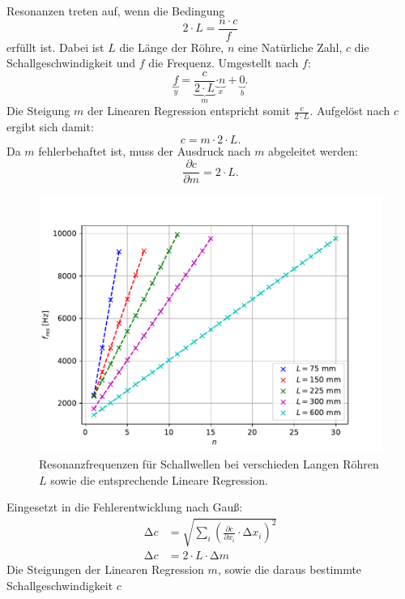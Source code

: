 Resonanzen treten auf, wenn die Bedingung
\begin{equation}
  2\cdot L=\frac{n\cdot c}{f}
\end{equation}
erfüllt ist. Dabei ist $L$ die Länge der Röhre, $n$ eine Natürliche Zahl, $c$ die Schallgeschwindigkeit und $f$ die Frequenz.
Umgestellt nach $f$:
\begin{equation}
  \underbrace{f}_{y}=\underbrace{\frac{c}{2\cdot L}}_{m}\underbrace{\cdot n}_{x}+\underbrace{0}_{b}.
\end{equation}
Die Steigung $m$ der Linearen Regression entspricht somit $\frac{c}{2\cdot L}$. Aufgelöst nach $c$ ergibt sich damit:
\begin{equation}
  c=m\cdot2\cdot L.
\end{equation}
Da $m$ fehlerbehaftet ist, muss der Ausdruck nach $m$ abgeleitet werden:
\begin{equation}
  \frac{\partial c}{\partial m}=2\cdot L.
\end{equation}
\begin{figure}
  \centering
  \includegraphics[scale=0.45]{Messwerte/plot3.pdf}
  \caption{Resonanzfrequenzen für Schallwellen bei verschieden Langen Röhren $L$ sowie die entsprechende Lineare Regression.}
  \label{fig:plot3}
\end{figure}
Eingesetzt in die Fehlerentwicklung nach Gauß:
\begin{align}
  \increment c &= \sqrt{\sum_i (\frac{\partial c}{\partial x_i}\cdot\increment x_i)^2}\\
  \increment c &= 2\cdot L\cdot\increment m
\end{align}
Die Steigungen der Linearen Regression $m$, sowie die daraus bestimmte Schallgeschwindigkeit $c$
